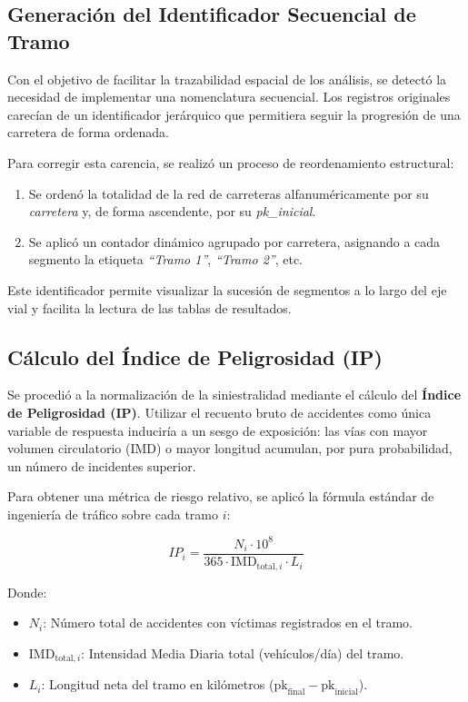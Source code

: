 \documentclass[twoside,a4paper,12pt,onecolumn,openany]{book}
\begin{document}
\subsection{Generación del Identificador Secuencial de Tramo}

Con el objetivo de facilitar la trazabilidad espacial de los análisis, se detectó la necesidad de implementar una nomenclatura secuencial. Los registros originales carecían de un identificador jerárquico que permitiera seguir la progresión de una carretera de forma ordenada.

\vspace{0,5cm}

Para corregir esta carencia, se realizó un proceso de reordenamiento estructural:
\begin{enumerate}
    \item Se ordenó la totalidad de la red de carreteras alfanuméricamente por su \textit{carretera} y, de forma ascendente, por su \textit{pk\_inicial}.
    \item Se aplicó un contador dinámico agrupado por carretera, asignando a cada segmento la etiqueta \textit{``Tramo 1''}, \textit{``Tramo 2''}, etc.
\end{enumerate}
Este identificador permite visualizar la sucesión de segmentos a lo largo del eje vial y facilita la lectura de las tablas de resultados.

\subsection{Cálculo del Índice de Peligrosidad (IP)}

Se procedió a la normalización de la siniestralidad mediante el cálculo del \textbf{Índice de Peligrosidad (IP)}. Utilizar el recuento bruto de accidentes como única variable de respuesta induciría a un sesgo de exposición: las vías con mayor volumen circulatorio (IMD) o mayor longitud acumulan, por pura probabilidad, un número de incidentes superior.

\vspace{0,5cm}

Para obtener una métrica de riesgo relativo, se aplicó la fórmula estándar de ingeniería de tráfico sobre cada tramo $i$:

$$IP_i = \frac{N_i \cdot 10^8}{365 \cdot \text{IMD}_{\text{total},i} \cdot L_i}$$

Donde:
\begin{itemize}
    \item $N_i$: Número total de accidentes con víctimas registrados en el tramo.
    \item $\text{IMD}_{\text{total},i}$: Intensidad Media Diaria total (vehículos/día) del tramo.
    \item $L_i$: Longitud neta del tramo en kilómetros ($\text{pk}_{\text{final}} - \text{pk}_{\text{inicial}}$).
\end{itemize}
\end{document}
